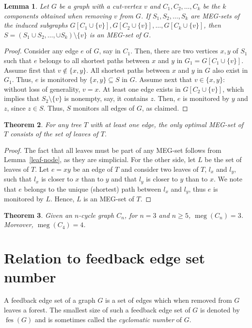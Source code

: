 \documentclass[10pt,a4paper]{amsart}
\theoremstyle{plain}
\newtheorem{theorem}{Theorem}
\newtheorem{lemma}[theorem]{Lemma}
\theoremstyle{definition}
\DeclareMathOperator{\fes}{fes}
\DeclareMathOperator{\MEG}{meg}
\begin{document}
\begin{lemma}\label{cutv}
Let $G$ be a graph with a cut-vertex $v$ and $C_1,C_2,\ldots,C_k$ be the $k$ components obtained when removing $v$ from $G$. If $S_1, S_2,\ldots, S_k$ are MEG-sets of the induced subgraphs $G[C_1 \cup \{v\}], G[C_2 \cup \{v\}],\ldots,G[C_k \cup \{v\}]$, then $S = (S_1\cup S_2,\ldots,\cup S_k)\setminus\{v\}$ is an MEG-set of $G$.
\end{lemma}
\begin{proof}
Consider any edge $e$ of $G$, say in $C_1$. Then, there are two vertices $x,y$ of $S_1$ such that $e$ belongs to all shortest paths between $x$ and $y$ in $G_1=G[C_1\cup\{v\}]$. Assume first that $v\notin\{x,y\}$. All shortest paths between $x$ and $y$ in $G$ also exist in $G_1$. Thus, $e$ is monitored by $\{x,y\}\subseteq S$ in $G$. Assume next that $v \in\{x,y\}$: without loss of generality, $v = x$. At least one edge exists in $G[C_2 \cup \{v\}]$, which implies that $S_2\setminus\{v\}$ is nonempty, say, it contains $z$. Then, $e$ is monitored by $y$ and $z$, since $z\in S$. Thus, $S$ monitors all edges of $G$, as claimed.
\end{proof}

\begin{theorem}\label{tt}\label{thm:trees}
For any tree $T$ with at least one edge, the only optimal MEG-set of $T$ consists of the set of leaves of $T$.
\end{theorem}
\begin{proof} The fact that all leaves must be part of any MEG-set follows from Lemma~\ref{leaf-node}, as they are simplicial. For the other side, let $L$ be the set of leaves of $T$. Let $e = xy$ be an edge of $T$ and consider two leaves of $T$, $l_x$ and $l_y$, such that $l_x$ is closer to $x$ than to $y$ and that $l_y$ is closer to $y$ than to $x$. We note that $e$ belongs to the unique (shortest) path between $l_x$ and $l_y$, thus $e$ is monitored by $L$. Hence, $L$ is an MEG-set of $T$. 
\end{proof}

\begin{theorem}\label{cyclet}
Given an $n$-cycle graph $C_n$, for $n = 3$ and $n \geq 5$, $\MEG(C_n) = 3$. Moreover, $\MEG(C_4) = 4$.
\end{theorem}

\section{Relation to feedback edge set number}\label{sec:fes}
A feedback edge set of a graph $G$ is a set of edges which when removed from $G$ leaves a forest. The smallest size of such a feedback edge set of $G$ is denoted by $\fes(G)$ and is sometimes called the \emph{cyclomatic number} of $G$.
\end{document}
